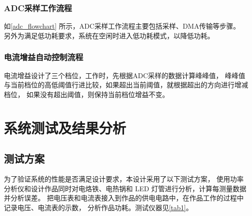 \documentclass[a4paper,12pt,UTF8]{article}
\begin{document}
\subsubsection{ADC采样工作流程}
如\autoref{adc_flowchart} 所示，ADC采样工作流程主要包括采样、DMA传输等步骤。
另外为满足低功耗要求，系统在空闲时进入低功耗模式，以降低功耗。


\subsubsection{电流增益自动控制流程}
电流增益设计了三个档位，工作时，先根据ADC采样的数据计算峰峰值，
峰峰值与当前档位的高低阈值行进比较，如果超出当前阈值，就根据超出的方向进行增减档位，
如果没有超出阈值，则保持当前档位增益不变。

\section{系统测试及结果分析}

\subsection{测试方案}
为了验证系统的性能是否满足设计要求，本设计采用了以下测试方案，
使用功率分析仪和设计作品同时对电烙铁、电热锅和 LED 灯管进行分析，计算每测量数据并分析误差。
把电压表和电流表接入到作品的供电电路中，在作品工作的过程中记录电压、电流表的示数，
分析作品功耗。测试仪器见\autoref{tab1}。
\end{document}
